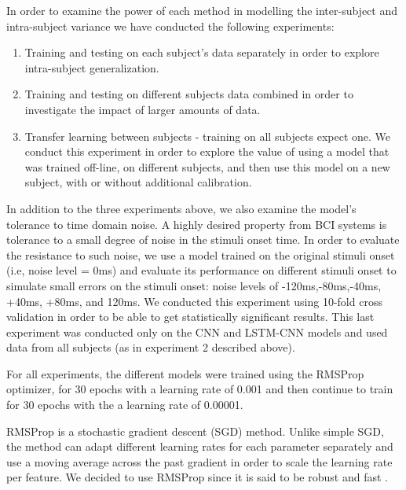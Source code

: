 \documentclass[
12pt, %
english, %
doublespacing, %
headsepline, %
]{MastersDoctoralThesis} %
\begin{document}
							
								
In order to examine the power of each method in modelling the inter-subject and  intra-subject variance we have conducted the following experiments:
\begin{enumerate}
	\item Training and testing on each subject's data separately in order to explore intra-subject generalization.
	\item Training and testing on different subjects data combined in order to investigate the impact of larger amounts of data.
	\item Transfer learning between subjects - training on all subjects expect one. We conduct this experiment in order to explore the value of using a model that was trained off-line, on different subjects, and then use this model on a new subject, with or without additional calibration.
\end{enumerate}
									
In addition to the three experiments above, we also examine the model's tolerance to time domain noise. A highly desired property from BCI systems is tolerance to a small degree of noise in the stimuli onset time.  In order to evaluate the resistance to such noise, we use a model trained on the original stimuli onset (i.e, noise level = 0ms) and evaluate its performance on different stimuli onset to simulate small errors on the stimuli onset: noise levels of -120ms,-80ms,-40ms, +40ms, +80ms, and 120ms. We conducted this experiment using 10-fold cross validation in order to be able to get statistically significant results. This last experiment was conducted only on the CNN and LSTM-CNN models and used data from all subjects (as in experiment 2 described above).

For all experiments, the different models were trained using the RMSProp~\cite{tieleman2012lecture} optimizer, for 30 epochs with a learning rate of 0.001 and then continue to train for 30 epochs with the a learning rate of 0.00001.

RMSProp \cite{tieleman2012lecture} is a stochastic gradient descent (SGD) method. Unlike simple SGD, the method can adapt different learning rates for each parameter separately and use a moving average across the past gradient in order to scale the learning rate per feature. We decided to use RMSProp since it is said to be robust and fast \cite{xu2015show, karpathy2015deep, szegedy2016rethinking}.
\end{document}

